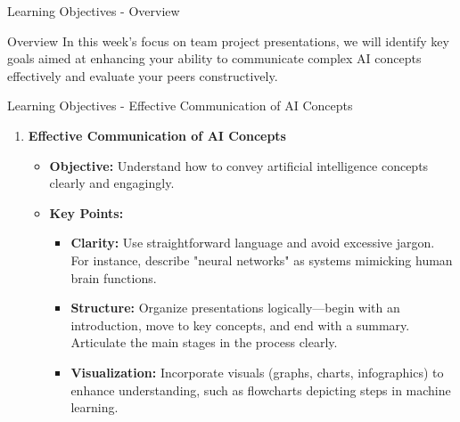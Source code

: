 \documentclass[aspectratio=169]{beamer}
\begin{document}
\begin{frame}[fragile]{Learning Objectives - Overview}
    \begin{block}{Overview}
        In this week’s focus on team project presentations, we will identify key goals aimed at enhancing your ability to communicate complex AI concepts effectively and evaluate your peers constructively.
    \end{block}
\end{frame}

\begin{frame}[fragile]{Learning Objectives - Effective Communication of AI Concepts}
    \begin{enumerate}
        \item \textbf{Effective Communication of AI Concepts}
        \begin{itemize}
            \item \textbf{Objective:} Understand how to convey artificial intelligence concepts clearly and engagingly.
            \item \textbf{Key Points:}
            \begin{itemize}
                \item \textbf{Clarity:} Use straightforward language and avoid excessive jargon. For instance, describe "neural networks" as systems mimicking human brain functions.
                \item \textbf{Structure:} Organize presentations logically—begin with an introduction, move to key concepts, and end with a summary. Articulate the main stages in the process clearly.
                \item \textbf{Visualization:} Incorporate visuals (graphs, charts, infographics) to enhance understanding, such as flowcharts depicting steps in machine learning.
            \end{itemize}
        \end{itemize}
    \end{enumerate}
\end{frame}
\end{document}
